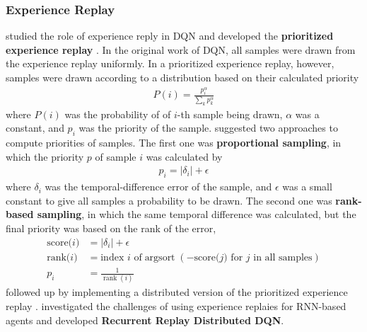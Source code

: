 \subsubsection{Experience Replay}
\citeauthor{PrioritizedExperienceReplay_Schaul.Quan.ea_2016} studied the role of experience reply in DQN and developed the \textbf{prioritized experience replay} \cite{PrioritizedExperienceReplay_Schaul.Quan.ea_2016}.
In the original work of DQN, all samples were drawn from the experience replay uniformly.
In a prioritized experience replay, however, samples were drawn according to a distribution based on their calculated priority
\begin{align*}
    P(i)=\frac{p_{i}^{\alpha}}{\sum_{k} p_{k}^{\alpha}}
\end{align*}
where $P(i)$ was the probability of of $i$-th sample being drawn, $\alpha$ was a constant, and $p_i$ was the priority of the sample.
\citeauthor{PrioritizedExperienceReplay_Schaul.Quan.ea_2016} suggested two approaches to compute priorities of samples.
The first one was \textbf{proportional sampling}, in which the priority $p$ of sample $i$ was calculated by
\begin{align*}
    p_i = \left|\delta_{i}\right|+\epsilon
\end{align*}
where $\delta_{i}$ was the temporal-difference error of the sample, and $\epsilon$ was a small constant to give all samples a probability to be drawn.
The second one was \textbf{rank-based sampling}, in which the same temporal difference was calculated, but the final priority was based on the rank of the error,
\begin{align*}
    \text{score($i$)}  & = \left|\delta_{i}\right|+\epsilon  \\
    \text{rank($i$)}   & = \text{index  $i$ of} \operatorname{argsort}(-\text{score($j$) for $j$ in all samples} )  \\
    p_{i}              & = \frac{1}{\operatorname{rank}(i)}
\end{align*}
\citeauthor{DistributedPrioritizedExperience_Horgan.Quan.ea_2018} followed up by implementing a distributed version of the prioritized experience replay \cite{DistributedPrioritizedExperience_Horgan.Quan.ea_2018}.
\citeauthor{RECURRENTEXPERIENCEREPLAY_Kapturowski.Ostrovski.ea_2019a} investigated the challenges of using experience replaies for RNN-based agents and developed \textbf{Recurrent Replay Distributed DQN}.

